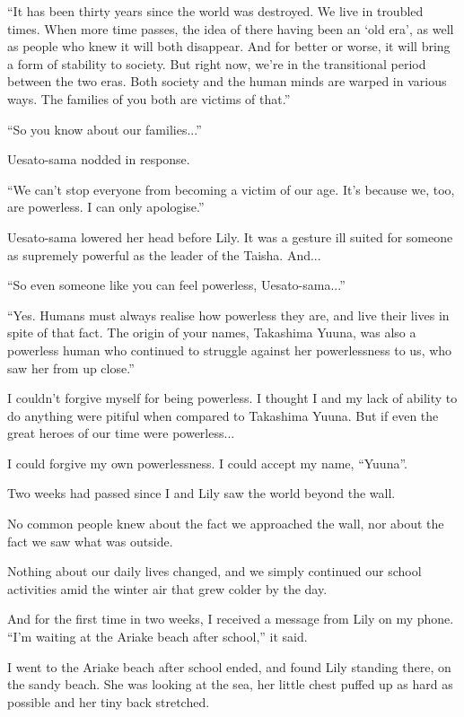 ``It has been thirty years since the world was destroyed. We live in troubled times. When more time passes, the idea of there having been an `old era', as well as people who knew it will both disappear. And for better or worse, it will bring a form of stability to society. But right now, we're in the transitional period between the two eras. Both society and the human minds are warped in various ways. The families of you both are victims of that.''

``So you know about our families...''

Uesato-sama nodded in response.

``We can't stop everyone from becoming a victim of our age. It's because we, too, are powerless. I can only apologise.''

Uesato-sama lowered her head before Lily. It was a gesture ill suited for someone as supremely powerful as the leader of the Taisha. And...

``So even someone like you can feel powerless, Uesato-sama...''

``Yes. Humans must always realise how powerless they are, and live their lives in spite of that fact. The origin of your names, Takashima Yuuna, was also a powerless human who continued to struggle against her powerlessness to us, who saw her from up close.''

I couldn't forgive myself for being powerless. I thought I and my lack of ability to do anything were pitiful when compared to Takashima Yuuna. But if even the great heroes of our time were powerless...

I could forgive my own powerlessness. I could accept my name, ``Yuuna''.


Two weeks had passed since I and Lily saw the world beyond the wall.

No common people knew about the fact we approached the wall, nor about the fact we saw what was outside.

Nothing about our daily lives changed, and we simply continued our school activities amid the winter air that grew colder by the day.

And for the first time in two weeks, I received a message from Lily on my phone. ``I'm waiting at the Ariake beach after school,'' it said.

I went to the Ariake beach after school ended, and found Lily standing there, on the sandy beach. She was looking at the sea, her little chest puffed up as hard as possible and her tiny back stretched.

